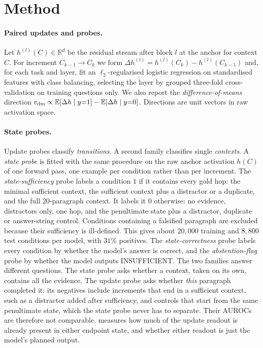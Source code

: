\section{Method}
\label{sec:method}

\paragraph{Paired updates and probes.}
Let $h^{(l)}(C)\in\mathbb R^{d}$ be the residual stream after block $l$ at the anchor for context $C$. For increment $C_{k-1}\to C_k$ we form $\Delta h^{(l)}=h^{(l)}(C_k)-h^{(l)}(C_{k-1})$ and, for each task and layer, fit an $\ell_2$-regularised logistic regression on standardised features with class balancing, selecting the layer by grouped three-fold cross-validation on training questions only. We also report the \emph{difference-of-means} direction $v_{\mathrm{dm}}\propto\mathbb E[\Delta h\mid y{=}1]-\mathbb E[\Delta h\mid y{=}0]$. Directions are unit vectors in raw activation space.

\paragraph{State probes.}
Update probes classify \emph{transitions}. A second family classifies single \emph{contexts}. A \emph{state probe} is fitted with the same procedure on the raw anchor activation $h(C)$ of one forward pass, one example per condition rather than per increment. The \emph{state-sufficiency} probe labels a condition $1$ if it contains every gold hop: the minimal sufficient context, the sufficient context plus a distractor or a duplicate, and the full 20-paragraph context. It labels it $0$ otherwise: no evidence, distractors only, one hop, and the penultimate state plus a distractor, duplicate or answer-string control. Conditions containing a falsified paragraph are excluded because their sufficiency is ill-defined. This gives about $20{,}000$ training and $8{,}800$ test conditions per model, with $31\%$ positives. The \emph{state-correctness} probe labels every condition by whether the model's answer is correct, and the \emph{abstention-flag} probe by whether the model outputs INSUFFICIENT. The two families answer different questions. The state probe asks whether a context, taken on its own, contains all the evidence. The update probe asks whether \emph{this} paragraph completed it: its negatives include increments that end in a sufficient context, such as a distractor added after sufficiency, and controls that start from the same penultimate state, which the state probe never has to separate. Their AUROCs are therefore not comparable.  measures how much of the update readout is already present in either endpoint state, and whether either readout is just the model's planned output.

